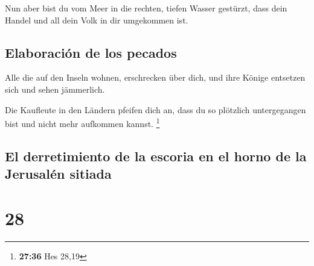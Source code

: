  Nun aber bist du vom Meer in die rechten, tiefen Wasser
gestürzt, dass dein Handel und all dein Volk in dir umgekommen ist.

\hypertarget{elaboraciuxf3n-de-los-pecados}{%
\subsection{Elaboración de los
pecados}\label{elaboraciuxf3n-de-los-pecados}}

 Alle die auf den Inseln wohnen, erschrecken über dich,
und ihre Könige entsetzen sich und sehen jämmerlich.

 Die Kaufleute in den Ländern pfeifen dich an, dass du so
plötzlich untergegangen bist und nicht mehr aufkommen kannst.
\footnote{\textbf{27:36} Hes 28,19}

\hypertarget{el-derretimiento-de-la-escoria-en-el-horno-de-la-jerusaluxe9n-sitiada}{%
\subsection{El derretimiento de la escoria en el horno de la Jerusalén
sitiada}\label{el-derretimiento-de-la-escoria-en-el-horno-de-la-jerusaluxe9n-sitiada}}

\hypertarget{section-27}{%
\section{28}\label{section-27}}

